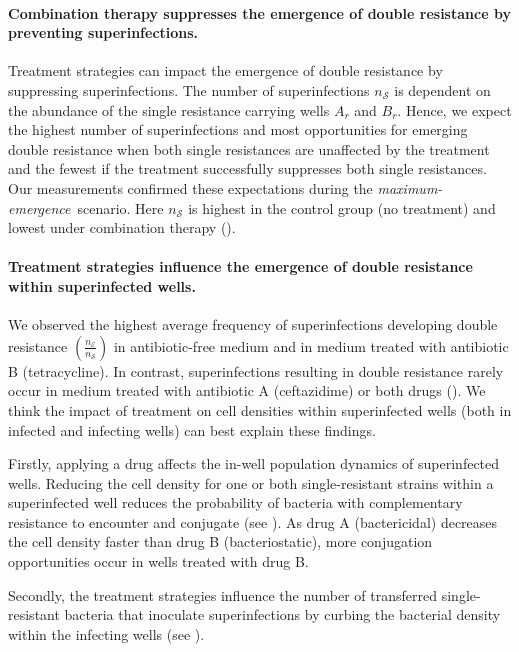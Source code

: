 \paragraph{Combination therapy suppresses the emergence of double resistance by preventing superinfections.}
Treatment strategies can impact the emergence of double resistance by suppressing superinfections.
The number of superinfections $n_\mathcal{S}$ is dependent on the abundance of the single resistance carrying wells $A_r$ and $B_r$.
Hence, we expect the highest number of superinfections and most opportunities for emerging double resistance when both single resistances are unaffected by the treatment and the fewest if the treatment successfully suppresses both single resistances. 
Our measurements confirmed these expectations during the \textit{maximum-emergence}~scenario.
Here $n_\mathcal{S}$ is highest in the control group (no treatment) and lowest under combination therapy ().

\paragraph{Treatment strategies influence the emergence of double resistance within superinfected wells.}
We observed the highest average frequency of superinfections developing double resistance $(\frac{n_\mathcal{E}}{n_\mathcal{S}})$ in antibiotic-free medium and in medium treated with antibiotic B (tetracycline). 
In contrast, superinfections resulting in double resistance rarely occur in medium treated with antibiotic A (ceftazidime) or both drugs ().
We think the impact of treatment on cell densities within superinfected wells (both in infected and infecting wells) can best explain these findings.

Firstly, applying a drug affects the in-well population dynamics of superinfected wells.
Reducing the cell density for one or both single-resistant strains within a superinfected well reduces the probability of bacteria with complementary resistance to encounter and conjugate (see ). 
As drug A (bactericidal) decreases the cell density faster than drug B (bacteriostatic), more conjugation opportunities occur in wells treated with drug B.

Secondly, the treatment strategies influence the number of transferred single-resistant bacteria that inoculate superinfections by curbing the bacterial density within the infecting wells (see ).

